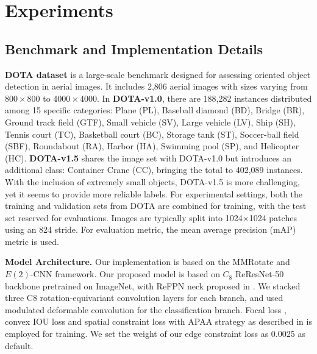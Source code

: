 \documentclass[letterpaper]{article} %
\begin{document}
\begin{table}[t]
   
    \caption{\textbf{Comparisons with state-of-the-art methods on DOTA-v1.5 OBB Task.} RetinaNet-O, Mask R-CNN, HTC, and ReDet reported from \citep{han2021ReDet}.
    }
   \label{tab:dotav15_sota}
\end{table}



\section{Experiments}

\subsection{Benchmark and Implementation Details}
\textbf{DOTA dataset} \citep{DOTA,9560031} is a large-scale benchmark designed for assessing oriented object detection in aerial images. It includes 2,806 aerial images with sizes varying from $800\times800$ to $4000\times4000$. In \textbf{DOTA-v1.0}, there are 188,282 instances distributed among 15 specific categories: Plane (PL), Baseball diamond (BD), Bridge (BR), Ground track field (GTF), Small vehicle (SV), Large vehicle (LV), Ship (SH), Tennis court (TC), Basketball court (BC), Storage tank (ST), Soccer-ball field (SBF), Roundabout (RA), Harbor (HA), Swimming pool (SP), and Helicopter (HC). \textbf{DOTA-v1.5} shares the image set with DOTA-v1.0 but introduces an additional class: Container Crane (CC), bringing the total to 402,089 instances. With the inclusion of extremely small objects, DOTA-v1.5 is more challenging, yet it seems to provide more reliable labels. For experimental settings, both the training and validation sets from DOTA are combined for training, with the test set reserved for evaluations. Images are typically split into 1024×1024 patches using an 824 stride. For evaluation metric, the mean average precision (mAP) metric \citep{everingham2010pascal} is used.

\textbf{Model Architecture.} Our implementation is based on the MMRotate \citep{zhou2022mmrotate} and $E(2)$-CNN \citep{weiler2019general} framework. Our proposed model is based on \(C_8\) ReResNet-50 backbone pretrained on ImageNet, with ReFPN neck proposed in \citet{han2021ReDet}. We stacked three C8 rotation-equivariant convolution layers for each branch, and used modulated deformable convolution \citep{zhu2019deformable} for the classification branch. Focal loss \citep{lin2017focal}, convex IOU loss \citep{rezatofighi2019convexiou} and spatial constraint loss with APAA strategy as described in \citet{li2022oriented} is employed for training. We set the weight of our edge constraint loss as 0.0025 as default.
\end{document}
